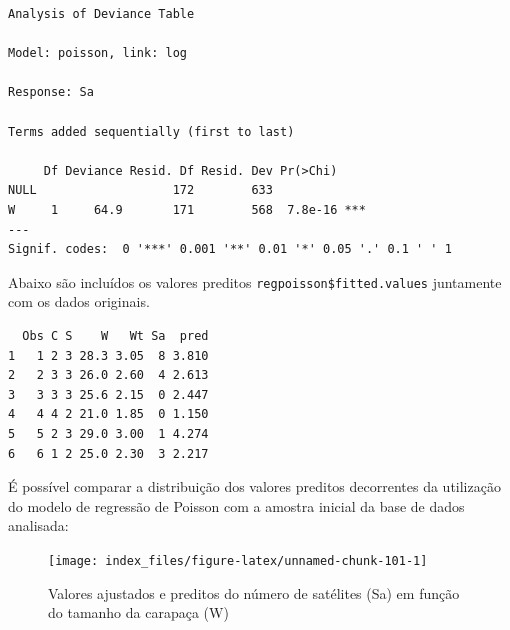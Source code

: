 \documentclass[12pt,brazil,oneside]{book}
\newenvironment{Shaded}{\begin{snugshade}}{\end{snugshade}}
\newcommand{\DataTypeTok}[1]{\textcolor[rgb]{0.13,0.29,0.53}{#1}}
\newcommand{\KeywordTok}[1]{\textcolor[rgb]{0.13,0.29,0.53}{\textbf{#1}}}
\newcommand{\NormalTok}[1]{#1}
\newcommand{\OperatorTok}[1]{\textcolor[rgb]{0.81,0.36,0.00}{\textbf{#1}}}
\newcommand{\StringTok}[1]{\textcolor[rgb]{0.31,0.60,0.02}{#1}}
\begin{document}
\begin{verbatim}
Analysis of Deviance Table

Model: poisson, link: log

Response: Sa

Terms added sequentially (first to last)

     Df Deviance Resid. Df Resid. Dev Pr(>Chi)    
NULL                   172        633             
W     1     64.9       171        568  7.8e-16 ***
---
Signif. codes:  0 '***' 0.001 '**' 0.01 '*' 0.05 '.' 0.1 ' ' 1
\end{verbatim}

Abaixo são incluídos os valores preditos \texttt{regpoisson\$fitted.values} juntamente com os dados originais.

\begin{Shaded}
\end{Shaded}

\begin{verbatim}
  Obs C S    W   Wt Sa  pred
1   1 2 3 28.3 3.05  8 3.810
2   2 3 3 26.0 2.60  4 2.613
3   3 3 3 25.6 2.15  0 2.447
4   4 4 2 21.0 1.85  0 1.150
5   5 2 3 29.0 3.00  1 4.274
6   6 1 2 25.0 2.30  3 2.217
\end{verbatim}

É possível comparar a distribuição dos valores preditos decorrentes da utilização do modelo de regressão de Poisson com a amostra inicial da base de dados analisada:

\begin{Shaded}
\end{Shaded}

\begin{figure}[H]

{\centering \texttt{[image: index\_files/figure-latex/unnamed-chunk-101-1]} 

}

\caption{Valores ajustados e preditos do número de satélites (Sa) em função do tamanho da carapaça (W)}\label{fig:unnamed-chunk-101}
\end{figure}
\end{document}
